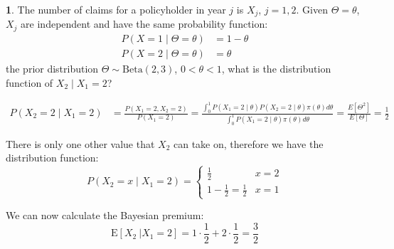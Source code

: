 \documentclass[english,12pt]{article}
\theoremstyle{plain}
\theoremstyle{definition}
\newtheorem*{example}{\protect\examplename}
\theoremstyle{definition} %
\providecommand{\examplename}{Example}
\newcommand{\condex}[2]{\mbox{E} \left[ \left. #1 \ \right\vert \left. #2 \right. \right]}
\begin{document}
\begin{example}
The number of claims for a policyholder in year $j$ is $X_j$, $j=1,2$.  Given $\Theta=\theta$, $X_j$ are independent and have the same probability function:
\begin{align*}
P(X=1\mid\Theta=\theta)&=1-\theta\\
P(X=2\mid\Theta=\theta)&=\theta
\end{align*}
the prior distribution $\Theta\sim \text{Beta}(2,3)$, $0<\theta<1$, what is the distribution function of $X_2\mid X_1=2$?

\begin{align*}
P(X_2=2\mid X_1=2)
&=\frac{P(X_1=2,X_2=2)}{P(X_1=2)}
=\frac{\int_0^1P(X_1=2\mid\theta)P(X_2=2\mid\theta)\pi(\theta)d\theta}{\int_0^1P(X_1=2\mid\theta)\pi(\theta)d\theta}
=\frac{E\left[\Theta^2\right]}{E\left[\Theta\right]}
=\frac{1}{2}
\end{align*}

There is only one other value that $X_2$ can take on, therefore we have the distribution function:
\[P(X_2=x\mid X_1=2)=\begin{cases}
\frac{1}{2} & x=2\\
1-\frac{1}{2}=\frac{1}{2} & x=1
\end{cases}\]

We can now calculate the Bayesian premium:
\[\condex{X_2}{X_1=2}=1\cdot\frac{1}{2}+2\cdot\frac{1}{2}=\frac{3}{2}\]
\end{example}
\end{document}
